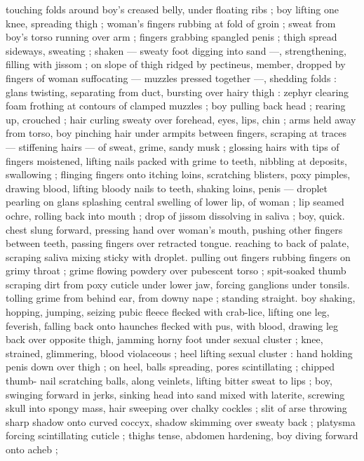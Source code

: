 touching folds around boy's creased belly, under floating ribs ; boy 
lifting one knee, spreading thigh ; woman's fingers rubbing at fold of 
groin ; sweat from boy's torso running over arm ; fingers grabbing 
spangled penis ; thigh spread sideways, sweating ; shaken --- sweaty 
foot digging into sand ---, strengthening, filling with jissom ; on 
slope of thigh ridged by pectineus, member, dropped by fingers of 
woman suffocating --- muzzles pressed together ---, shedding folds 
: glans twisting, separating from duct, bursting over hairy thigh : 
zephyr clearing foam frothing at contours of clamped muzzles ; boy 
pulling back head ; rearing up, crouched ; hair curling sweaty over 
forehead, eyes, lips, chin ; arms held away from torso, boy pinching 
hair under armpits between fingers, scraping at traces --- stiffening 
hairs --- of sweat, grime, sandy musk ; glossing hairs with tips of 
fingers moistened, lifting nails packed with grime to teeth, nibbling 
at deposits, swallowing ; flinging fingers onto itching loins, 
scratching blisters, poxy pimples, drawing blood, lifting bloody nails 
to teeth, shaking loins, penis --- droplet pearling on glans splashing 
central swelling of lower lip, of woman ; lip seamed ochre, rolling 
back into mouth ; drop of jissom dissolving in saliva ; boy, quick. 
chest slung forward, pressing hand over woman's mouth, pushing 
other fingers between teeth, passing fingers over retracted tongue. 
reaching to back of palate, scraping saliva mixing sticky with droplet. 
pulling out fingers rubbing fingers on grimy throat ; grime flowing 
powdery over pubescent torso ; spit-soaked thumb scraping dirt 
from poxy cuticle under lower jaw, forcing ganglions under tonsils. 
tolling grime from behind ear, from downy nape ; standing straight. 
boy shaking, hopping, jumping, seizing pubic fleece flecked with 
crab-lice, lifting one leg, feverish, falling back onto haunches flecked 
with pus, with blood, drawing leg back over opposite thigh, jamming 
horny foot under sexual cluster ; knee, strained, glimmering, blood 
violaceous ; heel lifting sexual cluster : hand holding penis down over 
thigh ; on heel, balls spreading, pores scintillating ; chipped thumb- 
nail scratching balls, along veinlets, lifting bitter sweat to lips ; boy, 
swinging forward in jerks, sinking head into sand mixed with laterite, 
screwing skull into spongy mass, hair sweeping over chalky cockles 
; slit of arse throwing sharp shadow onto curved coccyx, shadow 
skimming over sweaty back ; platysma forcing scintillating cuticle ; 
thighs tense, abdomen hardening, boy diving forward onto acheb ; 
